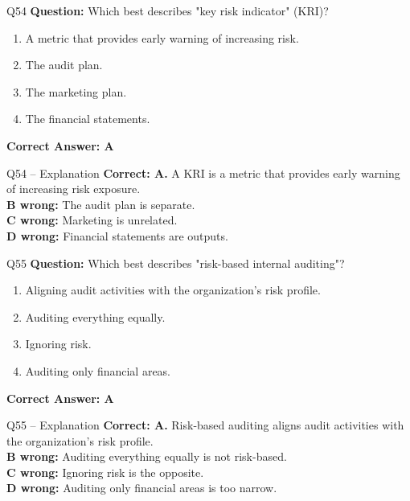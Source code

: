 \documentclass[aspectratio=169,10pt]{beamer}
\begin{document}
	\begin{frame}[t]{Q54}
		\small
		\textbf{Question:} Which best describes "key risk indicator" (KRI)?
		\begin{enumerate}[label=\Alph*.,itemsep=1pt,topsep=2pt]
			\item A metric that provides early warning of increasing risk.
			\item The audit plan.
			\item The marketing plan.
			\item The financial statements.
		\end{enumerate}
		\vspace{4pt}
		\textbf{Correct Answer: A}
	\end{frame}
	
	\begin{frame}[t]{Q54 -- Explanation}
		\small
		\textbf{Correct: A.} A KRI is a metric that provides early warning of increasing risk exposure. \\[4pt]
		\textbf{B wrong:} The audit plan is separate. \\[2pt]
		\textbf{C wrong:} Marketing is unrelated. \\[2pt]
		\textbf{D wrong:} Financial statements are outputs.
	\end{frame}
	
	\begin{frame}[t]{Q55}
		\small
		\textbf{Question:} Which best describes "risk-based internal auditing"?
		\begin{enumerate}[label=\Alph*.,itemsep=1pt,topsep=2pt]
			\item Aligning audit activities with the organization's risk profile.
			\item Auditing everything equally.
			\item Ignoring risk.
			\item Auditing only financial areas.
		\end{enumerate}
		\vspace{4pt}
		\textbf{Correct Answer: A}
	\end{frame}
	
	\begin{frame}[t]{Q55 -- Explanation}
		\small
		\textbf{Correct: A.} Risk-based auditing aligns audit activities with the organization's risk profile. \\[4pt]
		\textbf{B wrong:} Auditing everything equally is not risk-based. \\[2pt]
		\textbf{C wrong:} Ignoring risk is the opposite. \\[2pt]
		\textbf{D wrong:} Auditing only financial areas is too narrow.
	\end{frame}
	
\end{document}
